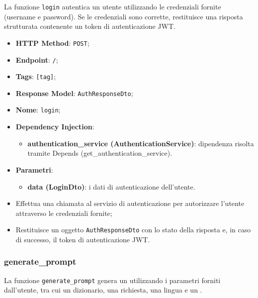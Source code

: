 \par La funzione \texttt{login} autentica un utente utilizzando le credenziali fornite (username e password). Se le credenziali sono corrette, restituisce una risposta strutturata contenente un token di autenticazione JWT.

\begin{itemize}
  \item \textbf{HTTP Method}: \texttt{POST};
  \item \textbf{Endpoint}: \texttt{/};
  \item \textbf{Tags}: \texttt{[tag]};
  \item \textbf{Response Model}: \texttt{AuthResponseDto};
  \item \textbf{Nome}: \texttt{login};
  \item \textbf{Dependency Injection}:
  \begin{itemize}
  \item \textbf{authentication\_service (AuthenticationService)}: dipendenza risolta tramite Depends (get\_authentication\_service).
  \end{itemize}
  \item \textbf{Parametri}:
  \begin{itemize}
    \item \textbf{data (LoginDto)}: i dati di autenticazione dell'utente.
  \end{itemize}
\end{itemize}

\begin{itemize}
  \item Effettua una chiamata al servizio di autenticazione per autorizzare l'utente attraverso le credenziali fornite;
  \item Restituisce un oggetto \texttt{AuthResponseDto} con lo stato della risposta e, in caso di successo, il token di autenticazione JWT.
\end{itemize}



\subsubsection{generate\_prompt}

\par La funzione \texttt{generate\_prompt} genera un  utilizzando i parametri forniti dall'utente, tra cui un dizionario, una richiesta, una lingua e un .

